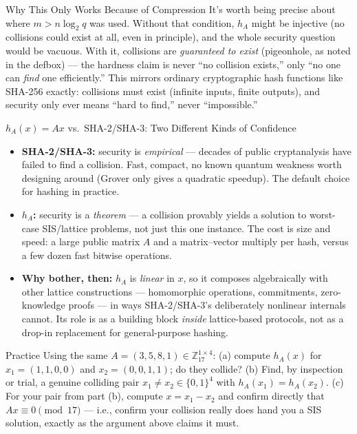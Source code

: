 \begin{rmkbox}{Why This Only Works Because of Compression}
It's worth being precise about where $m > n\log_2 q$ was used. Without that condition, $h_A$ might be injective (no collisions could exist at all, even in principle), and the whole security question would be vacuous. With it, collisions are \emph{guaranteed to exist} (pigeonhole, as noted in the defbox) --- the hardness claim is never ``no collision exists,'' only ``no one can \emph{find} one efficiently.'' This mirrors ordinary cryptographic hash functions like SHA-256 exactly: collisions must exist (infinite inputs, finite outputs), and security only ever means ``hard to find,'' never ``impossible.''
\end{rmkbox}

\begin{factbox}{$h_A(x) = Ax$ vs.\ SHA-2/SHA-3: Two Different Kinds of Confidence}
\begin{itemize}[leftmargin=*]
  \item \textbf{SHA-2/SHA-3:} security is \emph{empirical} --- decades of public cryptanalysis have failed to find a collision. Fast, compact, no known quantum weakness worth designing around (Grover only gives a quadratic speedup). The default choice for hashing in practice.
  \item \textbf{$h_A$:} security is a \emph{theorem} --- a collision provably yields a solution to worst-case SIS/lattice problems, not just this one instance. The cost is size and speed: a large public matrix $A$ and a matrix--vector multiply per hash, versus a few dozen fast bitwise operations.
  \item \textbf{Why bother, then:} $h_A$ is \emph{linear} in $x$, so it composes algebraically with other lattice constructions --- homomorphic operations, commitments, zero-knowledge proofs --- in ways SHA-2/SHA-3's deliberately nonlinear internals cannot. Its role is as a building block \emph{inside} lattice-based protocols, not as a drop-in replacement for general-purpose hashing.
\end{itemize}
\end{factbox}

\begin{exercisebox}{Practice}
Using the same $A = (3,5,8,1) \in \mathbb{Z}_{17}^{1\times 4}$: (a) compute $h_A(x)$ for $x_1=(1,1,0,0)$ and $x_2=(0,0,1,1)$; do they collide? (b) Find, by inspection or trial, a genuine colliding pair $x_1 \ne x_2 \in \{0,1\}^4$ with $h_A(x_1)=h_A(x_2)$. (c) For your pair from part (b), compute $x=x_1-x_2$ and confirm directly that $Ax\equiv 0\pmod{17}$ --- i.e., confirm your collision really does hand you a SIS solution, exactly as the argument above claims it must.
\end{exercisebox}

